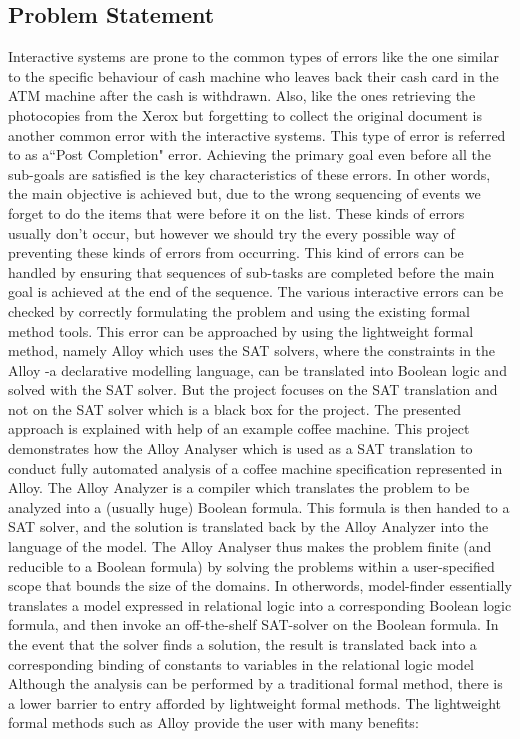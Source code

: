 \documentclass[a4paper,12pt]{extarticle}
\begin{document}
\subsection{Problem Statement}
\label{prob stat}
\onehalfspacing
\textrm {Interactive systems are prone to the common types of errors like the one similar to the specific behaviour of cash machine who leaves back their cash card in the ATM machine after the cash is withdrawn. Also, like the ones retrieving the photocopies from the Xerox but forgetting to collect the original document is another common error with the interactive systems. This type of error is referred to as a``Post Completion" error.\cite{Boyatt} Achieving the primary goal even before all the sub-goals are satisfied is the key characteristics of these errors. In other words, the main objective is achieved but, due to the wrong sequencing of events we forget to do the items that were before it on the list. These kinds of errors usually don't occur, but however we should try the every possible way of preventing these kinds of errors from occurring. This kind of errors can be handled by ensuring that sequences of sub-tasks are completed before the main goal is achieved at the end of the sequence. The various interactive errors can be checked by correctly formulating the problem and using the existing formal method tools\cite{P.Curson}. This error can be approached by using the lightweight formal method, namely Alloy which uses the SAT solvers, where the constraints in the Alloy -a declarative modelling language, can be translated into Boolean logic and solved with the SAT solver.\cite{Yeung2005} But the project focuses on the SAT translation and not on the  SAT solver which is a black box for the project. The presented approach is explained with help of an example coffee machine. This project demonstrates how the Alloy Analyser which is used as a SAT translation to conduct fully automated analysis of a coffee machine specification represented in Alloy. 
The Alloy Analyzer is a compiler which translates the problem to be analyzed into a (usually huge) Boolean formula. This formula is then handed to a SAT solver, and the solution is translated back by the Alloy Analyzer into the language of the model. The Alloy Analyser thus makes the problem finite (and reducible to a Boolean formula) by solving the problems within a user-specified scope that bounds the size of the domains. In otherwords, model-finder essentially translates a model expressed in relational logic into a corresponding Boolean logic formula, and then invoke an off-the-shelf SAT-solver on the Boolean formula. In the event that the solver finds a solution, the result is translated back into a corresponding binding of constants to variables in the relational logic model
Although the analysis can be performed by a traditional formal method, there is a lower barrier to entry afforded by lightweight formal methods.
The lightweight formal methods such as Alloy provide the user with many benefits:}
\end{document}
